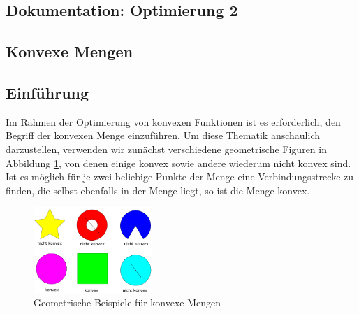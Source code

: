 \documentclass[a4paper]{article}
\begin{document}
\begin{center}
\section*{Dokumentation: Optimierung 2}
\end{center}

\begin{multicols}{2}

\section{Konvexe Mengen}

\subsection{Einführung}

Im Rahmen der Optimierung von konvexen Funktionen ist es erforderlich, den Begriff der konvexen Menge einzuführen. Um diese Thematik anschaulich darzustellen, verwenden wir zunächst verschiedene geometrische Figuren in Abbildung \ref{figure:konvexe-mengen}, von denen einige konvex sowie andere wiederum nicht konvex sind.
Ist es möglich für je zwei beliebige Punkte der Menge eine Verbindungsstrecke zu finden, die selbst ebenfalls in der Menge liegt, so ist die Menge konvex.

\end{multicols}

\begin{figure}[h]
\centering
\label{figure:konvexe-mengen}
\includegraphics[width=0.40\textwidth]{konvexe-mengen.pdf}
\caption{Geometrische Beispiele für konvexe Mengen}
\end{figure}
\end{document}
